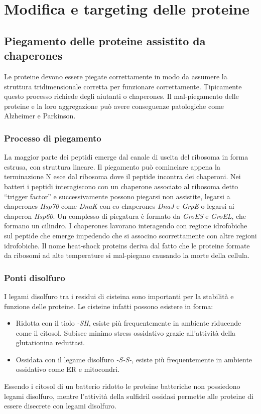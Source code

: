 \chapter{Modifica e targeting delle proteine}
\section{Piegamento delle proteine assistito da chaperones}
Le proteine devono essere piegate correttamente in modo da assumere la struttura tridimensionale corretta per funzionare correttamente. Tipicamente questo processo richiede degli aiutanti o chaperones. Il mal-piegamento delle
proteine e la loro aggregazione pu\`o avere conseguenze patologiche come Alzheimer e Parkinson. 
\subsection{Processo di piegamento}
La maggior parte dei peptidi emerge dal canale di uscita del ribosoma in forma estrusa, con struttura lineare. Il piegamento pu\`o 
cominciare appena la terminazione N esce dal ribosoma dove il peptide incontra dei chaperoni. Nei batteri i peptidi interagiscono con un chaperone associato al ribosoma detto ``trigger factor'' e successivamente possono
piegarsi non assistite, legarsi a chaperones \emph{Hsp70} come \emph{DnaK} con co-chaperones \emph{DnaJ} e \emph{GrpE} o legarsi ai chaperon \emph{Hsp60}. Un complesso di piegatura \`e formato da \emph{GroES} e \emph{GroEL}, che
formano un cilindro. I chaperones lavorano interagendo con regione idrofobiche sul peptide che emerge impedendo che si associno scorrettamente con altre regioni idrofobiche. Il nome heat-shock proteins deriva dal fatto che le 
proteine formate da ribosomi ad alte temperature si mal-piegano causando la morte della cellula. 
\subsection{Ponti disolfuro}
I legami disolfuro tra i residui di cisteina sono importanti per la stabilit\`a e funzione delle proteine. Le cisteine infatti possono esistere in forma:
\begin{itemize}
	\item Ridotta con il tiolo \emph{-SH}, esiste pi\`u frequentemente in ambiente riducende come il citosol. Subisce minimo stress ossidativo grazie all'attivit\`a della glutationina reduttasi.
	\item Ossidata con il legame disolfuro \emph{-S-S-}, esiste pi\`u frequentemente in ambiente ossidativo come ER e mitocondri.
\end{itemize}
Essendo i citosol di un batterio ridotto le proteine batteriche non possiedono legami disolfuro, mentre l'attivit\`a della sulfidril ossidasi permette alle proteine di essere disecrete con legami disolfuro.
